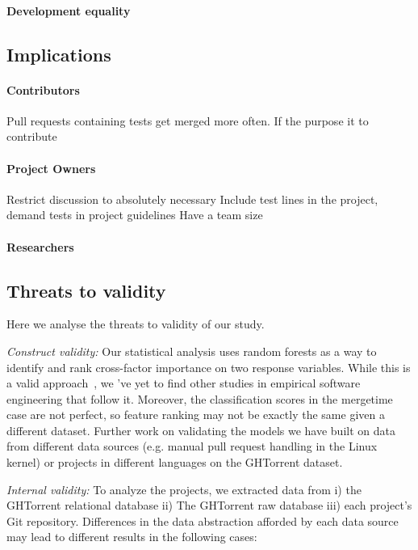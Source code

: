 \documentclass{sig-alternate}
\begin{document}
\paragraph{Development equality}


\subsection{Implications}

\paragraph{Contributors} Pull requests containing tests get merged more often.
If the purpose it to contribute  

\paragraph{Project Owners} Restrict discussion to absolutely necessary
Include test lines in the project, demand tests in project guidelines
Have a team size

\paragraph{Researchers} 

\subsection{Threats to validity}
Here we analyse the threats to validity of our study.

\noindent\emph{Construct validity:} Our statistical analysis uses random forests as a
way to identify and rank cross-factor importance on two response variables.
While this is a valid approach~\cite{}, we 've yet to find other studies in
empirical software engineering that follow it. Moreover, the classification
scores in the \textsf{mergetime} case are not perfect, so feature ranking may
not be exactly the same given a different dataset. Further work on validating
the models we have built on data from different data sources (e.g. manual pull
request handling in the Linux kernel) or projects in different languages on the
GHTorrent dataset.

\noindent\emph{Internal validity:}
To analyze the projects, we extracted data from i) the GHTorrent relational
database ii) The GHTorrent raw database iii) each project's Git repository.
Differences in the data abstraction afforded by each data source may
lead to different results in the following cases: 
\end{document}
